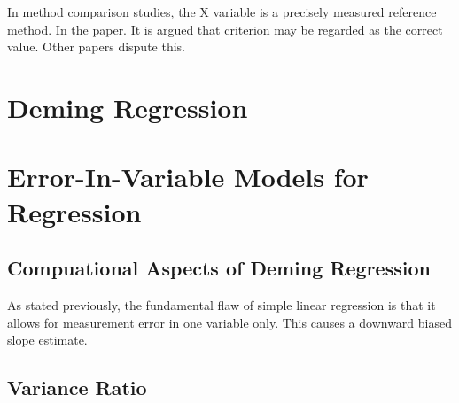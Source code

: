 \documentclass[12pt, a4paper]{report}
\theoremstyle{plain}
\theoremstyle{definition}
\theoremstyle{remark}
\begin{document}
In method comparison studies, the X variable is a precisely measured reference method. In the \citet{CornCoch} paper. It is argued that criterion may be regarded as the correct value. Other papers dispute this.






\section{Deming Regression}




\section{Error-In-Variable Models for Regression}













\subsection{Compuational Aspects of Deming Regression}









As stated previously, the fundamental flaw of simple linear regression is that it allows for measurement error in one variable only. This causes a downward biased slope estimate.





\subsection{Variance Ratio}
\end{document}
